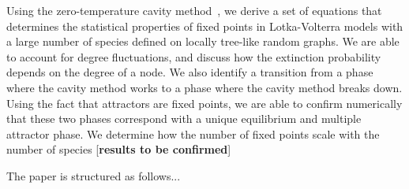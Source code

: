 \documentclass[11pt,a4paper]{article}
\begin{document}
  
Using the zero-temperature cavity method~\cite{mezard2003cavity},  we derive a set of equations that determines the statistical properties of fixed points in    Lotka-Volterra models with a large number of species defined on locally tree-like random graphs.    We are able to account for degree fluctuations, and discuss how the extinction probability depends on the degree of a node.    We also identify a transition from a  phase where the cavity method works to a phase where the cavity method breaks down.   Using the fact that attractors are fixed points, we are able to confirm numerically    that these two phases correspond with a unique equilibrium and multiple attractor phase.   We determine how the number of fixed points scale with the number of species [{\bf results to be confirmed}]  

The paper is structured as follows...


\end{document}
